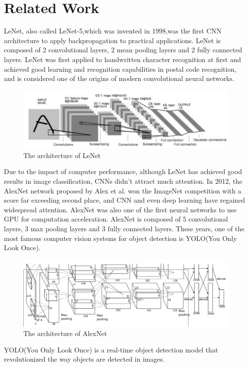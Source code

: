 \documentclass{article}
\begin{document}
\section{Related Work}
LeNet\cite{1998Gradient}, also called LeNet-5,which was invented in 1998,was the first CNN architecture to apply backpropagation to practical applications.
LeNet is composed of 2 convolutional layers, 2 mean pooling layers and 2 fully connected layers.
LeNet was first applied to handwritten character recognition at first and achieved good learning and recognition capabilities in postal code recognition, and is considered one of the origins of modern convolutional neural networks.
\begin{figure}[H]
  \centering
  \includegraphics[width=0.8\linewidth]{./lenet.png}
  \caption{The architecture of LeNet}
\end{figure}
Due to the impact of computer performance, although LeNet has achieved good results in image classification, CNNs didn't attract much attention. 
In 2012, the AlexNet\cite{2012ImageNet} network proposed by Alex et al. won the ImageNet competition with a score far exceeding second place, and CNN and even deep learning have regained widespread attention.
AlexNet was also one of the first neural networks to use GPU for computation acceleration.
AlexNet is composed of 5 convolutional layers, 3 max pooling layers and 3 fully connected layers.
These years, one of the most famous computer vision systems for object detection is YOLO(You Only Look Once). 
\begin{figure}[H]
  \centering
  \includegraphics[width=0.8\linewidth]{./alexnet.png}
  \caption{The architecture of AlexNet}
\end{figure}
YOLO(You Only Look Once)\cite{redmon2016you} is a real-time object detection model that revolutionized the way objects are detected in images.
\end{document}

